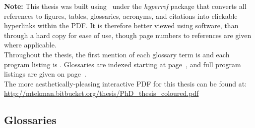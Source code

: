 \documentclass[11pt]{report} %
\begin{document}
\begin{spacing}{1.1}

\setcounter{page}{2}




{\noindent \textbf{Note:} This thesis was built using \LaTeXe\  under the \textit{hyperref} package that converts all references to figures, tables, glossaries, acronyms, and citations into clickable hyperlinks within the PDF. It is therefore better viewed using software, than through a hard copy for ease of use, though page numbers to references are given where applicable.}\\

{\noindent Throughout the thesis, the first mention of each glossary term is {} and each  program listing is {}. Glossaries are indexed starting at page~\pageref{ref:main:gloss}, and full program listings are given on page~\pageref{ref:meth:proglist}.}\\

{\noindent The more aesthetically-pleasing interactive PDF for this thesis can be found at:\\
\url{http://mtekman.bitbucket.org/thesis/PhD_thesis_coloured.pdf}}






	\begin{spacing}{1.2}

	\end{spacing}

\pagebreak
	\begin{spacing}{1.2}
	\tableofcontents
	\end{spacing}
\end{spacing}

\endgroup





\pagebreak







\begin{spacing}{1}

	\addtocounter{chapter}{1}
	\pagebreak
	
	\let\cleardoublepage\clearpage
	
	\appendix

	\pagebreak
	\chapter{Glossaries}\label{ref:main:gloss}
	\printglossary[type=bio ,style=super]
	\pagebreak
	\printglossary[type=comp,style=super]

\end{spacing}



\end{document}
